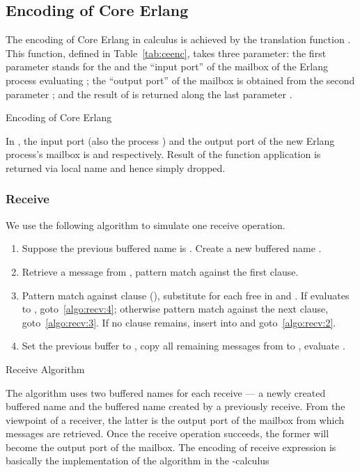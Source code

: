 \documentclass[runningheads, envcountsame, a4paper]{llncs}
\begin{document}
\subsection{Encoding of Core Erlang}
\label{app:ceenc}
The encoding of Core Erlang in  calculus is achieved by the translation function . This function, defined in Table~\ref{tab:ceenc}, takes three parameter:
the first parameter  stands for the  and the ``input port'' of the mailbox of the Erlang process evaluating ;
the ``output port'' of the mailbox is obtained from the second parameter ;
and the result of  is returned along the last parameter .

\begin{table}

\caption{Encoding of Core Erlang}
\label{tab:ceenc}
\end{table}

In , the input port (also the process ) and the output port of the new Erlang process's mailbox is  and  respectively.
Result of the function application is returned via local name  and hence simply dropped.

\subsubsection{Receive}
We use the following algorithm to simulate one receive operation.
\begin{table}
  \begin{enumerate}
      \item Suppose the previous buffered name is . Create a new buffered name .
      \item \label{algo:recv:2} Retrieve a message  from , pattern match  against the first clause.
      \item \label{algo:recv:3} Pattern match  against clause (), substitute  for each free  in  and . If  evaluates to , goto~\ref{algo:recv:4}; otherwise pattern match  against the next clause, goto~\ref{algo:recv:3}. If no clause remains, insert  into  and goto~\ref{algo:recv:2}.
      \item \label{algo:recv:4} Set the previous buffer to , copy all remaining messages from  to , evaluate .
    \end{enumerate}
    \caption{Receive Algorithm}
\end{table}

The algorithm uses two buffered names for each receive --- a newly created buffered name
and the buffered name created by a previously receive.
From the viewpoint of a receiver, the latter is the output port of the mailbox from which messages are retrieved.
Once the receive operation succeeds, the former will become the output port of the mailbox.
The encoding of receive expression is basically the implementation of the algorithm in the -calculus
\end{document}
